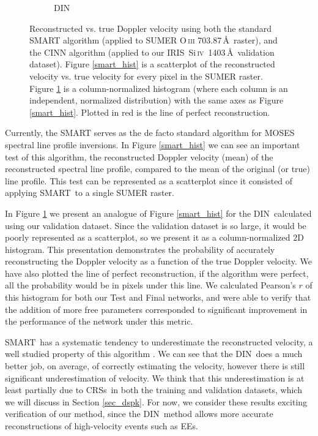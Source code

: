 \documentclass[10pt,letterpaper]{article}
\newcommand{\SiIV}{Si\,\textsc{iv}~1403\,\AA}
\newcommand{\OIII}{O\,\textsc{iii} 703.87\,\AA}
\newcommand{\EEs}{\acp{EE}}
\newcommand{\SMART}{\ac{SMART}}
\newcommand{\DIN}{\ac{DIN}}
\newcommand{\IRIS}{\ac{IRIS}}
\newcommand{\CRSs}{\acp{CRS}}
\begin{document}
\begin{figure}[t!]
\begin{subfigure}[t]{0.5\textwidth}
					\caption{DIN}
					\label{din_hist}
				\end{subfigure}
				\caption{Reconstructed vs. true Doppler velocity using both the standard SMART algorithm (applied to SUMER \OIII\ raster), and the CINN algorithm (applied to our \IRIS\ \SiIV\ validation dataset). Figure \ref{smart_hist} is a scatterplot of the reconstructed velocity vs. true velocity for every pixel in the SUMER raster. Figure \ref{din_hist} is a column-normalized histogram (where each column is an independent, normalized distribution) with the same axes as Figure \ref{smart_hist}. Plotted in red is the line of perfect reconstruction.}
				\label{dopp_hist}
			\end{figure}

			Currently, the \SMART\citep{fox1} serves as the de facto standard algorithm for MOSES spectral line profile inversions.
			In Figure \ref{smart_hist} we can see an important test of this algorithm, the reconstructed Doppler velocity (mean) of the reconstructed spectral line profile, compared to the mean of the original (or true) line profile.
			This test can be represented as a scatterplot since it consisted of applying \SMART\ to a single SUMER raster.
			
			In Figure \ref{din_hist} we present an analogue of Figure \ref{smart_hist} for the \DIN\ calculated using our validation dataset.
			Since the validation dataset is so large, it would be poorly represented as a scatterplot, so we present it as a column-normalized 2D histogram.
			This presentation demonstrates the probability of accurately reconstructing the Doppler velocity as a function of the true Doppler velocity.
			We have also plotted the line of perfect reconstruction, if the algorithm were perfect, all the probability would be in pixels under this line.
			We calculated Pearson's $r$ of this histogram for both our Test and Final networks, and were able to verify that the addition of more free parameters corresponded to significant improvement in the performance of the network under this metric.
			
			\SMART\ has a systematic tendency to underestimate the reconstructed velocity, a well studied property of this algorithm \citep{Fox2011,Rust2017}.
			We can see that the \DIN\ does a much better job, on average, of correctly estimating the velocity, however there is still significant underestimation of velocity.
			We think that this underestimation is at least partially due to \CRSs\ in both the training and validation datasets, which we will discuss in Section \ref{sec_dspk}.
			For now, we consider these results exciting verification of our method, since the \DIN\ method allows more accurate reconstructions of high-velocity events such as \EEs.		
						
\end{document}
